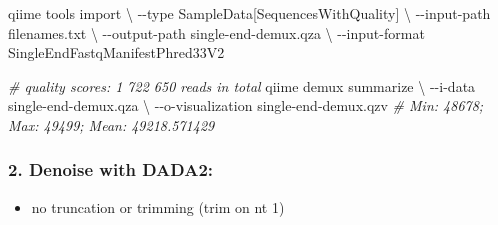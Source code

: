 \documentclass[
]{article}
\newenvironment{Shaded}{\begin{snugshade}}{\end{snugshade}}
\newcommand{\AttributeTok}[1]{\textcolor[rgb]{0.77,0.63,0.00}{#1}}
\newcommand{\CommentTok}[1]{\textcolor[rgb]{0.56,0.35,0.01}{\textit{#1}}}
\newcommand{\DataTypeTok}[1]{\textcolor[rgb]{0.13,0.29,0.53}{#1}}
\newcommand{\ExtensionTok}[1]{#1}
\newcommand{\NormalTok}[1]{#1}
\newcommand{\StringTok}[1]{\textcolor[rgb]{0.31,0.60,0.02}{#1}}
\providecommand{\tightlist}{%
  \setlength{\itemsep}{0pt}\setlength{\parskip}{0pt}}
\begin{document}
\begin{Shaded}
\begin{Highlighting}[]
\ExtensionTok{qiime}\NormalTok{ tools import }\DataTypeTok{\textbackslash{}}
  \AttributeTok{{-}{-}type}  \StringTok{\textquotesingle{}SampleData[SequencesWithQuality]\textquotesingle{}} \DataTypeTok{\textbackslash{}}
  \AttributeTok{{-}{-}input{-}path}\NormalTok{ filenames.txt }\DataTypeTok{\textbackslash{}}
  \AttributeTok{{-}{-}output{-}path}\NormalTok{ single{-}end{-}demux.qza }\DataTypeTok{\textbackslash{}}
  \AttributeTok{{-}{-}input{-}format}\NormalTok{ SingleEndFastqManifestPhred33V2 }
  
\CommentTok{\# quality scores: 1 722 650 reads in total}
\ExtensionTok{qiime}\NormalTok{ demux summarize }\DataTypeTok{\textbackslash{}}
  \AttributeTok{{-}{-}i{-}data}\NormalTok{ single{-}end{-}demux.qza }\DataTypeTok{\textbackslash{}}
  \AttributeTok{{-}{-}o{-}visualization}\NormalTok{ single{-}end{-}demux.qzv}
\CommentTok{\# Min: 48678; Max: 49499; Mean: 49218.571429}
\end{Highlighting}
\end{Shaded}

\hypertarget{denoise-with-dada2}{%
\subsubsection{2. Denoise with DADA2:}\label{denoise-with-dada2}}

\begin{itemize}
\tightlist
\item
  no truncation or trimming (trim on nt 1)
\end{itemize}
\end{document}

